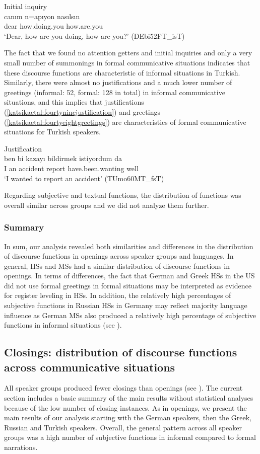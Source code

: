 \documentclass[output=paper,colorlinks,citecolor=brown]{langscibook}
\begin{document}
\ea Initial inquiry\\ \label{katsikaetal:fourtyseveninitial}
\gll canım n=apıyon nasılsın\\
     dear how.doing.you how.are.you\\
\glt ‘Dear, how are you doing, how are you?’ (DEbi52FT\_isT)
\z


The fact that we found no attention getters and initial inquiries and only a very small number of summonings in formal communicative situations indicates that these discourse functions are characteristic of informal situations in Turkish. Similarly, there were almost no justifications and a much lower number of greetings (informal: 52, formal: 128 in total) in informal communicative situations, and this implies that justifications (\ref{katsikaetal:fourtyninejustification}) and greetings (\ref{katsikaetal:fourtyeightgreetings}) are characteristics of formal communicative situations for Turkish speakers. 

\ea Justification\\ \label{katsikaetal:fourtyninejustification}
\gll ben bi kazayı bildirmek istiyordum da\\
     I an accident report have.been.wanting well\\
\glt ‘I wanted to report an accident’ (TUmo60MT\_fsT)
\z


Regarding subjective and textual functions, the distribution of functions was overall similar across groups and we did not analyze them further.

\subsubsection{Summary}
In sum, our analysis revealed both similarities and differences in the distribution of discourse functions in openings across speaker groups and languages. In general, HSs and MSs had a similar distribution of discourse functions in openings. In terms of differences, the fact that German and Greek HSs in the US did not use formal greetings in formal situations may be interpreted as evidence for register leveling in HSs. In addition, the relatively high percentages of subjective functions in Russian HSs in Germany may reflect majority language influence as German MSs also produced a relatively high percentage of subjective functions in informal situations (see ).

\subsection{Closings: distribution of discourse functions across communicative situations}
All speaker groups produced fewer closings than openings (see ). The current section includes a basic summary of the main results without statistical analyses because of the low number of closing instances. As in openings, we present the main results of our analysis starting with the German speakers, then the Greek, Russian and Turkish speakers. Overall, the general pattern across all speaker groups was a high number of subjective functions in informal compared to formal narrations. 
\end{document}
